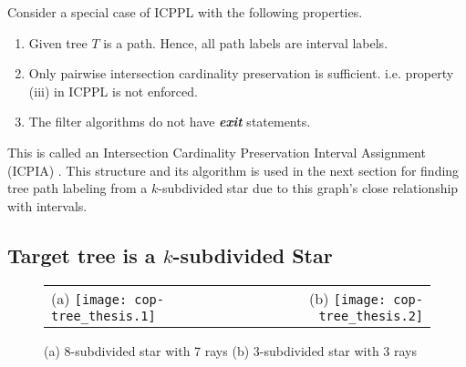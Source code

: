 Consider a special case of ICPPL with the following properties.
\begin{enumerate}
\item Given tree $T$ is a path. Hence, all path labels are interval
  labels.
\item Only pairwise intersection cardinality preservation is
  sufficient. i.e. property (iii) in ICPPL is not enforced.
\item The filter algorithms do not have {\em \bf exit} statements.
\end{enumerate}
This is called an Intersection Cardinality Preservation Interval
Assignment (ICPIA) \cite{nsnrs09}. This structure and its algorithm is
used in the next section for finding tree path labeling from a
$k$-subdivided star due to this graph's close relationship with
intervals.

\subsection{Target tree is a $k$-subdivided Star}
\label{sec:ksubdivstar}

\begin{figure}[t] %
  \centering
  \begin{tabular}{lr}
    (a) \texttt{[image: cop-tree\_thesis.1]}&
    (b) \texttt{[image: cop-tree\_thesis.2]}
  \end{tabular}
  \caption{\figtabsize (a) $8$-subdivided star with 7 rays (b)
    3-subdivided star with 3 rays}
  \label{fig:kstar}
\end{figure}

